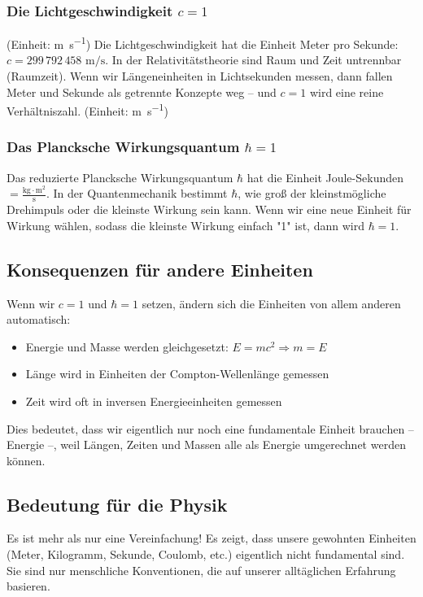 \documentclass{article}
\begin{document}
	\subsubsection{Die Lichtgeschwindigkeit $c = 1$}
	(Einheit: \si{\meter\per\second})	Die Lichtgeschwindigkeit hat die Einheit Meter pro Sekunde: $c = 299\,792\,458 \text{ m/s}$. In der Relativitätstheorie sind Raum und Zeit untrennbar (Raumzeit). Wenn wir Längeneinheiten in Lichtsekunden messen, dann fallen Meter und Sekunde als getrennte Konzepte weg – und $c = 1$ wird eine reine Verhältniszahl.
	(Einheit: \si{\meter\per\second})	
	\subsubsection{Das Plancksche Wirkungsquantum $\hbar = 1$}
	Das reduzierte Plancksche Wirkungsquantum $\hbar$ hat die Einheit Joule-Sekunden $= \frac{\text{kg} \cdot \text{m}^2}{\text{s}}$. In der Quantenmechanik bestimmt $\hbar$, wie groß der kleinstmögliche Drehimpuls oder die kleinste Wirkung sein kann. Wenn wir eine neue Einheit für Wirkung wählen, sodass die kleinste Wirkung einfach "1" ist, dann wird $\hbar = 1$.
	
	\subsection{Konsequenzen für andere Einheiten}
	Wenn wir $c = 1$ und $\hbar = 1$ setzen, ändern sich die Einheiten von allem anderen automatisch:
	
	\begin{itemize}
		\item Energie und Masse werden gleichgesetzt: $E = mc^2 \Rightarrow m = E$
		\item Länge wird in Einheiten der Compton-Wellenlänge gemessen
		\item Zeit wird oft in inversen Energieeinheiten gemessen
	\end{itemize}
	
	Dies bedeutet, dass wir eigentlich nur noch eine fundamentale Einheit brauchen – Energie –, weil Längen, Zeiten und Massen alle als Energie umgerechnet werden können.
	
	\subsection{Bedeutung für die Physik}
	Es ist mehr als nur eine Vereinfachung! Es zeigt, dass unsere gewohnten Einheiten (Meter, Kilogramm, Sekunde, Coulomb, etc.) eigentlich nicht fundamental sind. Sie sind nur menschliche Konventionen, die auf unserer alltäglichen Erfahrung basieren.
	
\end{document}

